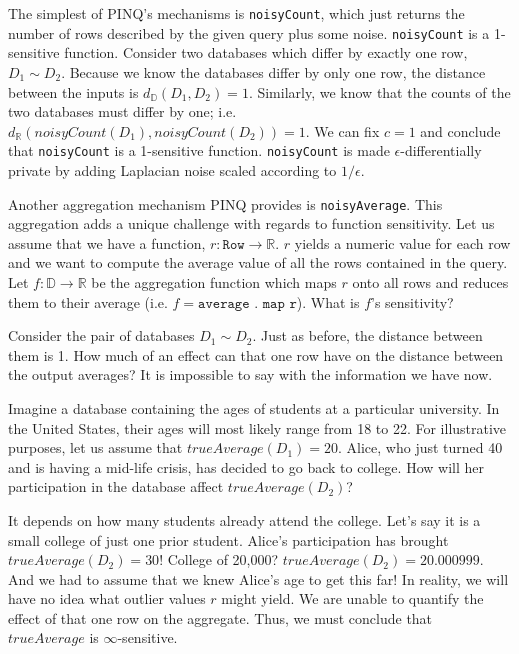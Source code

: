 \documentclass[12pt]{article}
\begin{document}
The simplest of PINQ's mechanisms is \texttt{noisyCount}, which just returns the number of rows described by the given query plus some noise.
\texttt{noisyCount} is a 1-sensitive function.
Consider two databases which differ by exactly one row, $D_1 \sim D_2$.
Because we know the databases differ by only one row, the distance between the inputs is $d_{\mathbb D}(D_1,D_2)=1$.
Similarly, we know that the counts of the two databases must differ by one; i.e. $d_{\mathbb R}(noisyCount(D_1),noisyCount(D_2))=1$.
We can fix $c=1$ and conclude that \texttt{noisyCount} is a 1-sensitive function.
\texttt{noisyCount} is made $\epsilon$-differentially private by adding Laplacian noise scaled according to $1/\epsilon$.

Another aggregation mechanism PINQ provides is \texttt{noisyAverage}.
This aggregation adds a unique challenge with regards to function sensitivity.
Let us assume that we have a function, $r : \texttt{Row} \rightarrow \mathbb R$.
$r$ yields a numeric value for each row and we want to compute the average value of all the rows contained in the query.
Let $f : \mathbb D \rightarrow \mathbb R$ be the aggregation function which maps $r$ onto all rows and reduces them to their average (i.e. $f = \texttt{average . map r}$).
What is $f$'s sensitivity?

Consider the pair of databases $D_1 \sim D_2$.
Just as before, the distance between them is 1.
How much of an effect can that one row have on the distance between the output averages?
It is impossible to say with the information we have now.

Imagine a database containing the ages of students at a particular university.
In the United States, their ages will most likely range from 18 to 22.
For illustrative purposes, let us assume that $trueAverage(D_1) = 20$.
Alice, who just turned 40 and is having a mid-life crisis, has decided to go back to college.
How will her participation in the database affect $trueAverage(D_2)$?

It depends on how many students already attend the college.
Let's say it is a small college of just one prior student.
Alice's participation has brought $trueAverage(D_2) = 30$!
College of 20,000?
$trueAverage(D_2) = 20.000999$.
And we had to assume that we knew Alice's age to get this far!
In reality, we will have no idea what outlier values $r$ might yield.
We are unable to quantify the effect of that one row on the aggregate.
Thus, we must conclude that $trueAverage$ is $\infty$-sensitive.
\end{document}
